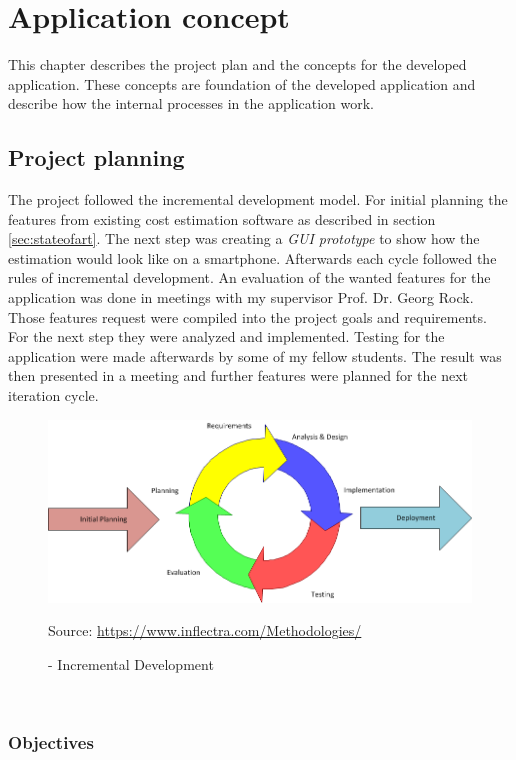 \chapter{Application concept}

This chapter describes the project plan and the concepts for the developed application. These concepts are foundation of the developed application and describe how the internal processes in the application work.


\section{Project planning}

The project followed the incremental development model. For initial planning the features from existing cost estimation software as described in section \ref{sec:stateofart}. The next step was creating a \textit{GUI prototype} to show how the estimation would look like on a smartphone. Afterwards each cycle followed the rules of incremental development. An evaluation of the wanted features for the application was done in meetings with my supervisor Prof. Dr. Georg Rock. Those features request were compiled into the project goals and requirements. For the next step they were analyzed and implemented. Testing for the application were made afterwards by some of my fellow students. The result was then presented in a meeting and further features were planned for the next iteration cycle.
\begin{figure}[h] 
	\centering 
	\includegraphics[width=14cm]{images/iterativeDev.PNG} 
	\caption{- Incremental Development} 
	Source: \url{https://www.inflectra.com/Methodologies/}
	\label{fig:incrementaldev}
\end{figure}\\


\subsection{Objectives}\label{objectives}

